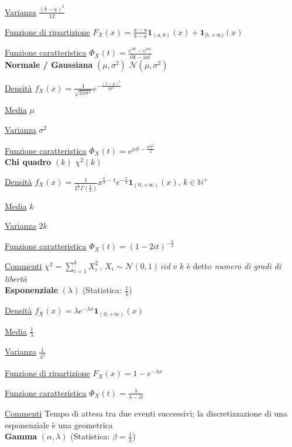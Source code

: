 \documentclass[openany]{book} %
\begin{document}
\begin{multicols}{2}
	\underline{Varianza} $\frac{(b-a)^2}{12}$

	\underline{Funzione di ripartizione} $F_X(x)=\frac{x-a}{b-a}\boldsymbol{1}_{(a,b)}(x)+\boldsymbol{1}_{[b,+\infty)}(x)$

	\underline{Funzione caratteristica} $\Phi_X(t)=\frac{e^{ibt}-e^{iat}}{ibt-iat}$
	\\

	\textbf{Normale / Gaussiana} $(\mu,\sigma^2)$ \quad $\mathcal{N}(\mu,\sigma^2)$

	\underline{Densità} $f_X(x) = \frac{1}{\sqrt{2\pi\sigma^2}}e^{-\frac{(x-\mu)^2}{2\sigma^2}}$

	\underline{Media} $\mu$

	\underline{Varianza} $\sigma^2$

	\underline{Funzione caratteristica} $\Phi_X(t)=e^{\mu it-\frac{\sigma^2t^2}{2}}$
	\\

	\textbf{Chi quadro} $(k)$ \quad $\chi^2(k)$

	\underline{Densità} $f_X(x) = \frac{1}{2^{\frac{k}{2}}\Gamma(\frac{k}{2})}x^{\frac{k}{2}-1}e^{-\frac{x}{2}}\boldsymbol{1}_{(0,+\infty)}(x)$, $k\in \mathbb{N}^+$

	\underline{Media} $k$

	\underline{Varianza} $2k$

	\underline{Funzione caratteristica} $\Phi_X(t)= (1-2it)^{-\frac{k}{2}}$

	\underline{Commenti} $\chi^2=\sum_{i=1}^k X_i^2\,,\,X_i\sim \mathcal{N}(0,1)\,iid$  e $k$ è detto \textit{numero di gradi di libertà}
	\\

	\textbf{Esponenziale} $(\lambda)$ (Statistica: $\frac{1}{\lambda}$) 

	\underline{Densità} $f_X(x) = \lambda e^{-\lambda x}\boldsymbol{1}_{(0,+\infty)}(x)$

	\underline{Media} $\frac{1}{\lambda}$

	\underline{Varianza} $\frac{1}{\lambda^2}$

	\underline{Funzione di ripartizione} $F_X(x)=1-e^{-\lambda x}$

	\underline{Funzione caratteristica} $\Phi_X(t)=\frac{\lambda}{\lambda-it}$

	\underline{Commenti} Tempo di attesa tra due eventi successivi; la discretizzazione di una esponenziale è una geometrica
	\\

	\textbf{Gamma} $(\alpha, \lambda)$ (Statistica: $\beta=\frac{1}{\lambda}$)


\end{multicols}
\end{document}
